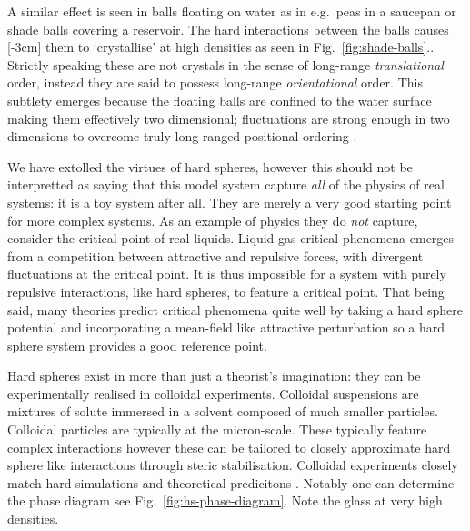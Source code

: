 \documentclass[11pt,twoside]{report}
\begin{document}
A similar effect is seen in balls floating on water as in e.g.\ peas in a saucepan or shade balls covering a reservoir.
The hard interactions between the balls causes%
[-3cm]
them to `crystallise' at high densities as seen in Fig.\ \ref{fig:shade-balls}..
Strictly speaking these are not crystals in the sense of long-range \emph{translational} order, instead they are said to possess long-range \emph{orientational} order.
This subtlety emerges because the floating balls are confined to the water surface making them effectively two dimensional; fluctuations are strong enough in two dimensions to overcome truly long-ranged positional ordering \cite{MerminPRL1966,MerminPR1968}.

We have extolled the virtues of hard spheres, however this should not be interpretted as saying that this model system capture \emph{all} of the physics of real systems: it is a toy system after all.
They are merely a very good starting point for more complex systems.
As an example of physics they do \emph{not} capture, consider the critical point of real liquids.
Liquid-gas critical phenomena emerges from a competition between attractive and repulsive forces, with divergent fluctuations at the critical point.
It is thus impossible for a system with purely repulsive interactions, like hard spheres, to feature a critical point.
That being said, many theories predict critical phenomena quite well by taking a hard sphere potential and incorporating a mean-field like attractive perturbation \cite{?} so a hard sphere system provides a good reference point.

Hard spheres exist in more than just a theorist's imagination: they can be experimentally realised in colloidal experiments.
Colloidal suspensions are mixtures of solute immersed in a solvent composed of much smaller particles.
Colloidal particles are typically at the micron-scale.
These typically feature complex interactions \cite{Royall?,?,?} however these can be tailored to closely approximate hard sphere like interactions through steric stabilisation.
Colloidal experiments closely match hard simulations and theoretical predicitons \cite{?}.
Notably one can determine the phase diagram see Fig.\ \ref{fig:hs-phase-diagram}.
Note the glass at very high densities.
\end{document}

